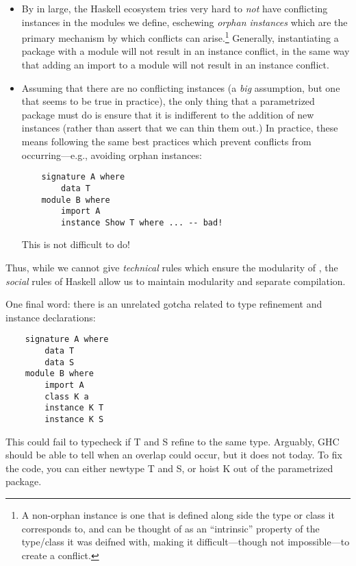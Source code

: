 \begin{itemize}
    \item By in large, the Haskell ecosystem tries very hard to
    \emph{not} have conflicting instances in the modules we define,
    eschewing \emph{orphan instances} which are the primary mechanism
    by which conflicts can arise.\footnote{A non-orphan instance is one that
    is defined along side the type or class it corresponds to, and can
    be thought of as an ``intrinsic'' property of the type/class it was
    deifned with, making it difficult---though not impossible---to
    create a conflict.}
    Generally, instantiating a \Backpack{} package with a module will
    not result in an instance conflict, in the same way that adding an
    import to a module will not result in an instance conflict.

    \item Assuming that there are no conflicting instances (a \emph{big}
    assumption, but one that seems to be true in practice), the only thing
    that a parametrized package must do is ensure that it is indifferent
    to the addition of new instances (rather than assert that we can thin
    them out.)  In practice, these means following the same best practices
    which prevent conflicts from occurring---e.g., avoiding orphan
    instances:

\begin{lstlisting}
    signature A where
        data T
    module B where
        import A
        instance Show T where ... -- bad!
\end{lstlisting}
%
    This is not difficult to do!
\end{itemize}
%
Thus, while we cannot give \emph{technical} rules which ensure the modularity
of \Backpack{}, the \emph{social} rules of Haskell allow us to maintain
modularity and separate compilation.

One final word: there is an unrelated gotcha related to type refinement
and instance declarations:

\begin{lstlisting}
    signature A where
        data T
        data S
    module B where
        import A
        class K a
        instance K T
        instance K S
\end{lstlisting}
%
This could fail to typecheck if T and S refine to the same type.  Arguably,
GHC should be able to tell when an overlap could occur, but it does not today.
To fix the code, you can either newtype T and S, or hoist K out of the
parametrized package.

